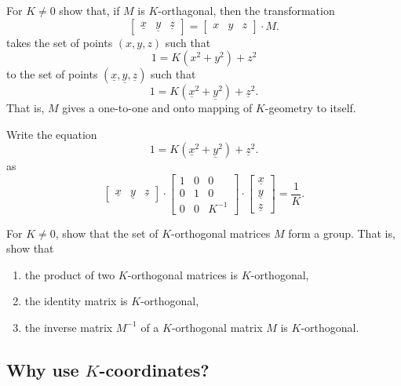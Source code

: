 \documentclass{ximera}
\begin{document}
\begin{problem}
  For $K\ne 0$ show that, if $M$ is $K$-orthagonal, then the transformation
  \[
  \begin{bmatrix}
    \underline{x} & \underline{y} & \underline{z}
  \end{bmatrix}
  =
  \begin{bmatrix}
    x & y & z
  \end{bmatrix}
  \cdot M.
  \]
  takes the set of points $\left(x,y,z\right)$ such
  that
\[
1 = K\left(x^2 + y^2\right) +z^2
\]
to the set of points
$\left(\underline{x},\underline{y},\underline{z}\right)$
such that
\[
1=K\left(\underline{x}^2 + \underline{y}^{2}\right) + \underline{z}^{2}.
\]
That is, $M$ gives a one-to-one and onto mapping of $K$-geometry to
itself.
\begin{hint}
  Write the equation
  \[
  1=K\left(\underline{x}^2 + \underline{y}^{2}\right) + \underline{z}^{2}.
  \]
  as
\[
\begin{bmatrix}
\underline{x} & \underline{y} & \underline{z}%
\end{bmatrix}  \cdot\begin{bmatrix}
1 & 0 & 0\\
0 & 1 & 0\\
0 & 0 & K^{-1}%
\end{bmatrix}  \cdot
\begin{bmatrix}
\underline{x}\\
\underline{y}\\
\underline{z}%
\end{bmatrix}  =\frac{1}{K}.
\]
\end{hint}
\end{problem}




\begin{problem}
For $K\neq0$, show that the set of $K$-orthogonal matrices $M$ form a
group.  That is, show that
\begin{enumerate}
\item the product of two $K$-orthogonal matrices is $K$-orthogonal,
\item the identity matrix is $K$-orthogonal,
\item the inverse matrix $M^{-1}$ of a $K$-orthogonal matrix $M$ is $K$-orthogonal.
\end{enumerate}
\end{problem}

\subsection*{Why use $K$-coordinates?}
\end{document}
